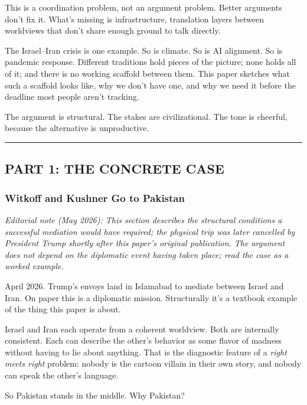 \documentclass[
]{article}
\begin{document}
This is a coordination problem, not an argument problem. Better
arguments don't fix it. What's missing is infrastructure, translation
layers between worldviews that don't share enough ground to talk
directly.

The Israel--Iran crisis is one example. So is climate. So is AI
alignment. So is pandemic response. Different traditions hold pieces of
the picture; none holds all of it; and there is no working scaffold
between them. This paper sketches what such a scaffold looks like, why
we don't have one, and why we need it before the deadline most people
aren't tracking.

The argument is structural. The stakes are civilizational. The tone is
cheerful, because the alternative is unproductive.

\begin{center}\rule{0.5\linewidth}{0.5pt}\end{center}

\subsection{PART 1: THE CONCRETE CASE}\label{part-1-the-concrete-case}

\subsubsection{Witkoff and Kushner Go to
Pakistan}\label{witkoff-and-kushner-go-to-pakistan}

\emph{Editorial note (May 2026): This section describes the
structural conditions a successful mediation would have required;
the physical trip was later cancelled by President Trump shortly
after this paper's original publication. The argument does not
depend on the diplomatic event having taken place; read the case as
a worked example.}

April 2026. Trump's envoys land in Islamabad to mediate between Israel
and Iran. On paper this is a diplomatic mission. Structurally it's a
textbook example of the thing this paper is about.

Israel and Iran each operate from a coherent worldview. Both are
internally consistent. Each can describe the other's behavior as some
flavor of madness without having to lie about anything. That is the
diagnostic feature of a \emph{right meets right} problem: nobody is the
cartoon villain in their own story, and nobody can speak the other's
language.

So Pakistan stands in the middle. Why Pakistan?
\end{document}
